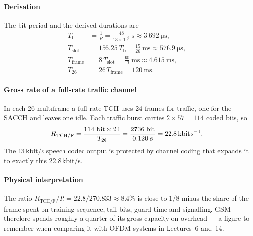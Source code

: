 \documentclass[11pt,a4paper]{article}
\begin{document}
\paragraph{Derivation} The bit period and the derived durations are
\begin{align}
  T_{\mathrm{b}} &= \frac{1}{R} = \frac{48}{13\times10^{6}}\ \mathrm{s}
     \approx \qty{3.692}{\micro\second}, \label{eq:tb}\\
  T_{\mathrm{slot}} &= 156.25\,T_{\mathrm{b}} = \frac{15}{26}\ \mathrm{ms}
     \approx \qty{576.9}{\micro\second}, \label{eq:tslot}\\
  T_{\mathrm{frame}} &= 8\,T_{\mathrm{slot}} = \frac{60}{13}\ \mathrm{ms}
     \approx \qty{4.615}{\milli\second}, \label{eq:tframe}\\
  T_{26} &= 26\,T_{\mathrm{frame}} = \qty{120}{\milli\second}. \label{eq:t26}
\end{align}
\paragraph{Gross rate of a full-rate traffic channel} In each 26-multiframe a
full-rate TCH uses 24 frames for traffic, one for the SACCH and leaves one idle.
Each traffic burst carries $2\times 57 = 114$ coded bits, so
\begin{equation}\label{eq:tchrate}
  R_{\mathrm{TCH/F}} = \frac{114\ \mathrm{bit}\times 24}{T_{26}}
  = \frac{2736\ \mathrm{bit}}{0.120\ \mathrm{s}} = \qty{22.8}{\kilo\bit\per\second}.
\end{equation}
The 13\,kbit/s speech codec output is protected by channel coding that expands it to
exactly this 22.8\,kbit/s.

\paragraph{Physical interpretation} The ratio
$R_{\mathrm{TCH/F}}/R = 22.8/270.833 \approx 8.4\%$ is close to $1/8$ minus the share of
the frame spent on training sequence, tail bits, guard time and signalling. GSM
therefore spends roughly a quarter of its gross capacity on overhead --- a figure to
remember when comparing it with OFDM systems in Lectures~6 and~14.
\end{document}
